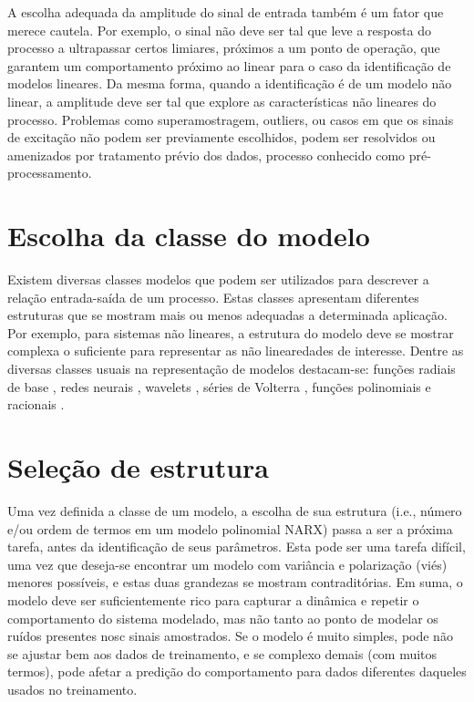A escolha adequada da amplitude do sinal de entrada também é um fator que merece cautela. Por exemplo, o sinal não deve ser tal que leve a resposta do processo a ultrapassar certos limiares,  próximos a um ponto de operação, que garantem um comportamento próximo ao linear para o caso da identificação de modelos lineares. Da mesma forma, quando a identificação é de um modelo não linear, a amplitude deve ser tal que explore as características não lineares do processo. 
Problemas como superamostragem, outliers, ou casos em que os sinais de excitação não podem ser previamente escolhidos, podem ser resolvidos ou amenizados por tratamento prévio dos dados, processo conhecido como pré-processamento. 

\section{Escolha da classe do modelo}\label{sec:escolha_modelo}

Existem diversas classes modelos que podem ser utilizados para descrever a relação entrada-saída de um processo. Estas classes apresentam diferentes estruturas que se mostram mais ou menos adequadas a determinada aplicação. Por exemplo, para sistemas não lineares, a estrutura do modelo deve se mostrar complexa o suficiente para representar as não linearedades de interesse. Dentre as diversas classes usuais na representação de modelos destacam-se: funções radiais de base \citep{broomhead1988}, redes neurais \citep{haykin1994}, wavelets \citep{strang1989}, séries de Volterra \citep{billings1980}, funções polinomiais e racionais \citep{billings1989}.

\section{Seleção de estrutura}\label{sec:estr_selection}

Uma vez definida a classe de um modelo, a escolha de sua estrutura (i.e., número e/ou ordem de termos em um modelo polinomial NARX) passa a ser a próxima tarefa, antes da identificação de seus parâmetros.
Esta pode ser uma tarefa difícil, uma vez que deseja-se encontrar um modelo com variância e polarização (viés) menores possíveis, e estas duas grandezas se mostram contraditórias. 
Em suma, o modelo deve ser suficientemente rico para capturar a dinâmica e repetir o comportamento do sistema modelado, mas não tanto ao ponto de modelar os ruídos  presentes nosc sinais amostrados.
Se o modelo é muito simples, pode não se ajustar bem aos dados de treinamento, e se complexo demais (com muitos termos), pode afetar a predição do comportamento para dados diferentes daqueles usados no treinamento.


